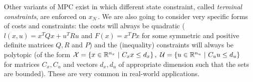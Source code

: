 \documentclass[12pt]{article}
\begin{document}
\vspace{12pt}

Other variants of MPC exist in which different state constraint, called \textit{terminal constraints}, are enforced on $x_N$\,.
We are also going to consider very specific forms of costs and constraints: the costs will always be quadratic ($l(x,u)=x^TQx+u^TRu$ and $F(x)=x^TPx$ for some symmetric and positive definite matrices $Q,R$ and $P$) and the (inequality) constraints will always be polytopic (of the form $\mathcal{X}=\left\{x\in\mathbb{R}^{n_x}~|~C_xx\leq d_x\right\},~\mathcal{U}=\left\{u\in\mathbb{R}^{n_u}~|~C_uu\leq d_u\right\}$ for matrices $C_x,C_u$ and vectors $d_x,d_u$ of appropriate dimension such that the sets are bounded).
These are very common in real-world applications.

\vspace{12pt}
\end{document}
